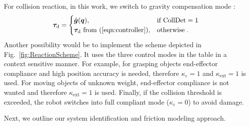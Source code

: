 For collision reaction, in this work, we switch to gravity compensation mode \cite{Haddadin2014}:
\begin{equation}
\bm{\tau}_\mathrm{d}=
\begin{cases}
    \hat{\bm{g}}(\bm{q}),& \text{if CollDet}=1 \\
    \bm{\tau}_\mathrm{d} \text{ from (\ref{eqn:controller})},& \text{otherwise}\;.
\end{cases}
\label{eqn:CollReact}
\end{equation}
%
Another possibility would be to implement the scheme depicted in Fig.~\ref{fig:ReactionScheme}.
It uses the three control modes in the table in a context sensitive manner.
For example, for grasping objects end-effector compliance and high position accuracy is needed, therefore \mbox{$\kappa_\varepsilon=1$} and \mbox{$\kappa_\mathrm{ext}=1$} is used. For moving objects of unknown weight, end-effector compliance is not wanted and therefore \mbox{$\kappa_\mathrm{ext}=1$} is used.
Finally, if the collision threshold is exceeded, the robot switches into full compliant mode (\mbox{$\kappa_\varepsilon=0$}) to avoid damage.

Next, we outline our system identification and friction modeling approach.


